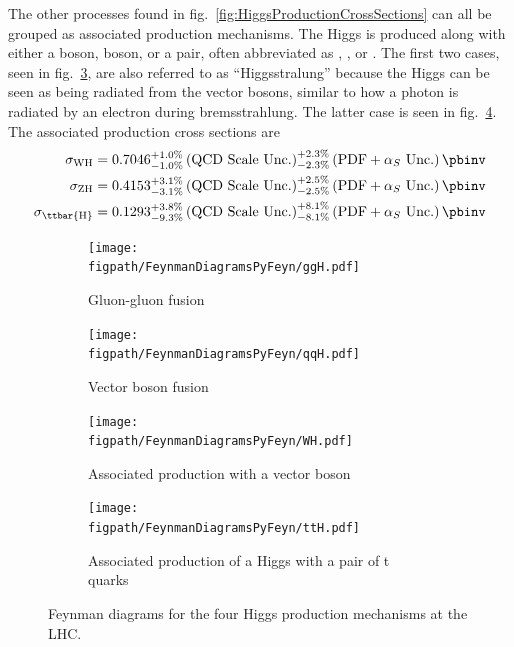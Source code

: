 The other processes found in fig.~\ref{fig:HiggsProductionCrossSections} can all be grouped as associated production mechanisms.
The Higgs is produced along with either a \Wpm boson, \Zz boson, or a \ttbar pair, often abbreviated as \WH, \ZH, or \ttH.
The first two cases, seen in fig.~\ref{fig:WH}, are also referred to as ``Higgsstralung'' because the Higgs can be seen as being radiated from the vector bosons, similar to how a photon is radiated by an electron during bremsstrahlung.
The latter case is seen in fig.~\ref{fig:ttH}.
The associated production cross sections are
\begin{align}
\begin{split}
	\sigma_{\text{WH}} &= \text{0.7046}_{-\text{1.0\%}}^{+\text{1.0\%}}\left(\text{QCD Scale Unc.}\right)_{-\text{2.3\%}}^{+\text{2.3\%}}\left(\text{PDF}+\alpha_{S}\text{ Unc.}\right)\pbinv \\
	\sigma_{\text{ZH}} &= \text{0.4153}_{-\text{3.1\%}}^{+\text{3.1\%}}\left(\text{QCD Scale Unc.}\right)_{-\text{2.5\%}}^{+\text{2.5\%}}\left(\text{PDF}+\alpha_{S}\text{ Unc.}\right)\pbinv \\
	\sigma_{\text{\ttbar{H}}} &= \text{0.1293}_{-\text{9.3\%}}^{+\text{3.8\%}}\left(\text{QCD Scale Unc.}\right)_{-\text{8.1\%}}^{+\text{8.1\%}}\left(\text{PDF}+\alpha_{S}\text{ Unc.}\right)\pbinv
\end{split}
\end{align}

\begin{figure}[bt]
  \centering
  \begin{subfigure}[t]{0.415\textwidth}
    \texttt{[image: \\figpath/FeynmanDiagramsPyFeyn/ggH.pdf]}
    \caption{Gluon-gluon fusion}
    \label{fig:ggH}
  \end{subfigure}%
  \hspace{0.5cm}
  \begin{subfigure}[t]{0.415\textwidth}
    \texttt{[image: \\figpath/FeynmanDiagramsPyFeyn/qqH.pdf]}
    \caption{Vector boson fusion}
    \label{fig:qqH}
  \end{subfigure}

  \begin{subfigure}[t]{0.415\textwidth}
    \texttt{[image: \\figpath/FeynmanDiagramsPyFeyn/WH.pdf]}
    \caption{Associated production with a vector boson}
    \label{fig:WH}
  \end{subfigure}
  \hspace{0.5cm}
  \begin{subfigure}[t]{0.415\textwidth}
    \texttt{[image: \\figpath/FeynmanDiagramsPyFeyn/ttH.pdf]}
    \caption{Associated production of a Higgs with a pair of t quarks}
    \label{fig:ttH}
  \end{subfigure}%
  \caption{Feynman diagrams for the four Higgs production mechanisms at the LHC.}
  \label{fig:Higgs_WW_lnujj_feynman}
\end{figure}

